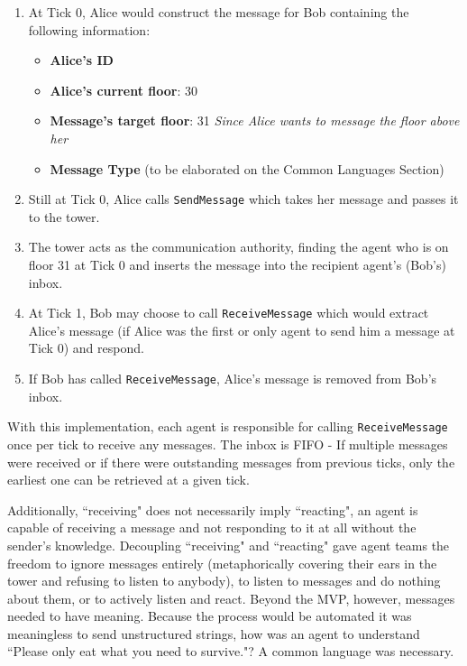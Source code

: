 \begin{enumerate}
    \item At Tick 0, Alice would construct the message for Bob containing the following information:
        \begin{itemize}
            \item \textbf{Alice's ID}
            \item \textbf{Alice's current floor}: 30
            \item \textbf{Message's target floor}: 31 \textit{Since Alice wants to message the floor above her}
            \item \textbf{Message Type} (to be elaborated on the Common Languages Section)
        \end{itemize}
    \item Still at Tick 0, Alice calls \texttt{SendMessage} which takes her message and passes it to the tower.
    \item The tower acts as the communication authority, finding the agent who is on floor 31 at Tick 0 and inserts the message into the recipient agent's (Bob's) inbox.
    \item At Tick 1, Bob may choose to call \texttt{ReceiveMessage} which would extract Alice's message (if Alice was the first or only agent to send him a message at Tick 0) and respond.
    \item If Bob has called \texttt{ReceiveMessage}, Alice's message is removed from Bob's inbox.
\end{enumerate}
With this implementation, each agent is responsible for calling \texttt{ReceiveMessage} once per tick to receive any messages. The inbox is FIFO - If multiple messages were received or if there were outstanding messages from previous ticks, only the earliest one can be retrieved at a given tick.

Additionally, ``receiving" does not necessarily imply ``reacting", an agent is capable of receiving a message and not responding to it at all without the sender's knowledge. Decoupling ``receiving" and ``reacting" gave agent teams the freedom to ignore messages entirely (metaphorically covering their ears in the tower and refusing to listen to anybody), to listen to messages and do nothing about them, or to actively listen and react. \newline
Beyond the MVP, however, messages needed to have meaning. Because the process would be automated it was meaningless to send unstructured strings, how was an agent to understand ``Please only eat what you need to survive."? \newline
A common language was necessary.

